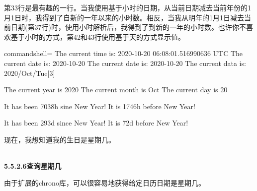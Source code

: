 第33行是最有趣的一行。当我使用基于小时的日期，从当前日期减去当前年份的1月1日时，我得到了自新的一年以来的小时数。相反，当我从明年的1月1日减去当前日期(第37行)时，使用小时解析后，我得到了到新的一年的小时数。也许你不喜欢基于小时的方式，第42和43行使用基于天的方式显示值。

\begin{tcblisting}{commandshell={}}
The current time is: 2020-10-20 06:08:01.516990636 UTC
The current date is: 2020-10-20
The current date is: 2020-10-20
The current data is: 2020/Oct/Tue[3]

The current year is 2020
The current month is Oct
The current day is 20

It has been 7038h sine New Year!
It is 1746h before New Year!

It has been 293d since New Year!
It is 72d before New Year!
\end{tcblisting}

现在，我想知道我的生日是星期几。

\hspace*{\fill} \\ %
\noindent
\textbf{5.5.2.6\hspace{0.2cm}查询星期几}

由于扩展的chrono库，可以很容易地获得给定日历日期是星期几。

